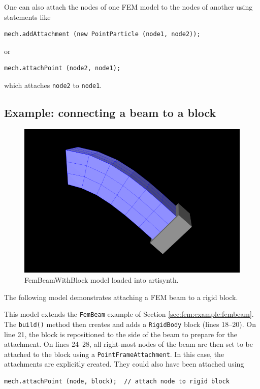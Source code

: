 One can also attach the nodes of one FEM model to the nodes of another
using statements like
%
\begin{lstlisting}[]
   mech.addAttachment (new PointParticle (node1, node2));
\end{lstlisting}
%
or
%
\begin{lstlisting}[]
   mech.attachPoint (node2, node1);
\end{lstlisting}
%
which attaches {\tt node2} to {\tt node1}.

\subsection{Example: connecting a beam to a block}

\begin{figure}[ht]
	\centering
	\includegraphics[width=\imglength]{images/FemBeamWithBlock}
	\caption{FemBeamWithBlock model loaded into artisynth.}
	\label{fig:fem:beamwithblock}
\end{figure}

The following model demonstrates attaching a FEM beam to a rigid block.
\lstset{numbers=left}

\lstset{numbers=none}
This model extends the {\tt FemBeam} example of Section 
\ref{sec:fem:example:fembeam}.  The {\tt build()} method then creates 
and adds a {\tt RigidBody} block (lines 18--20).  On line 21, the block
is repositioned to the side of the beam to prepare for the attachment.
On lines 24--28, all right-most nodes of the beam are then set to be attached
to the block using a {\tt PointFrameAttachment}.  In this case, the 
attachments are explicitly created.  They could also have been attached using
\begin{lstlisting}[]
   mech.attachPoint (node, block);  // attach node to rigid block
\end{lstlisting}

